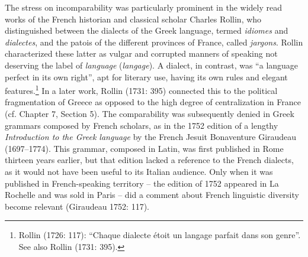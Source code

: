 \begin{styleStandard}
The stress on incomparability was particularly prominent in the widely read works of the French historian and classical scholar Charles Rollin, who distinguished between the dialects of the Greek language, termed \textit{idiomes} and \textit{dialectes}, and the patois of the different provinces of France, called \textit{jargons}. Rollin characterized these latter as vulgar and corrupted manners of speaking not deserving the label of \textit{language} (\textit{langage}). A dialect, in contrast, was “a language perfect in its own right”, apt for literary use, having its own rules and elegant features.\footnote{ Rollin (1726: 117): “Chaque dialecte étoit un langage parfait dans son genre”. See also Rollin (1731: 395).} In a later work, Rollin (1731: 395) connected this to the political fragmentation of Greece as opposed to the high degree of centralization in France (cf. Chapter 7, Section 5). The comparability was subsequently denied in Greek grammars composed by French scholars, as in the 1752 edition of a lengthy \textit{Introduction to the Greek language} by the French Jesuit Bonaventure Giraudeau (1697–1774). This grammar, composed in Latin, was first published in Rome thirteen years earlier, but that edition lacked a reference to the French dialects, as it would not have been useful to its Italian audience. Only when it was published in French-speaking territory – the edition of 1752 appeared in La Rochelle and was sold in Paris – did a comment about French linguistic diversity become relevant (Giraudeau 1752: 117).
\end{styleStandard}

